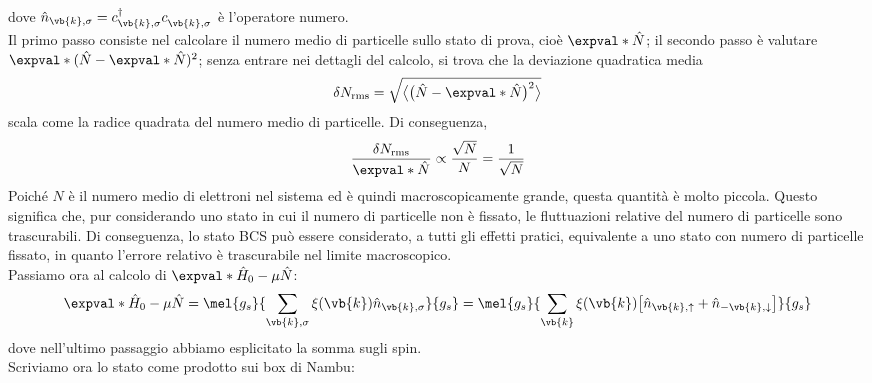dove $\hat{n}_{\vb{k},\sigma}=c^{\dag}_{\vb{k},\sigma} c^{\vphantom{\dag}}_{\vb{k},\sigma}$ è l'operatore numero.\\
Il primo passo consiste nel calcolare il numero medio di particelle sullo stato di prova, cioè $\expval*{\hat{N}}$; il secondo passo è valutare $\expval*{(\hat{N} - \expval*{\hat{N}})^2}$; senza entrare nei dettagli del calcolo, si trova che la deviazione quadratica media
\begin{equation*}
   \delta N_{\rm rms}
   =\sqrt{\big\langle \bigl( \hat{N} - \expval*{\hat{N}} \bigr)^2 \big\rangle}
\end{equation*}
scala come la radice quadrata del numero medio di particelle. Di conseguenza,
\begin{equation*}
   \frac{\delta N_{\rm rms}}{\expval*{\hat{N}}}
   \propto \frac{\sqrt{N}}{N}
   =\frac{1}{\sqrt{N}}
\end{equation*}
Poiché $N$ è il numero medio di elettroni nel sistema ed è quindi macroscopicamente grande, questa quantità è molto piccola. Questo significa che, pur considerando uno stato in cui il numero di particelle non è fissato, le fluttuazioni relative del numero di particelle sono trascurabili. Di conseguenza, lo stato BCS può essere considerato, a tutti gli effetti pratici, equivalente a uno stato con numero di particelle fissato, in quanto l'errore relativo è trascurabile nel limite macroscopico.
\\
Passiamo ora al calcolo di $\expval*{\hat{H}_0 - \mu \hat{N}}$:
\begin{equation*}
   \expval*{\hat{H}_0 - \mu \hat{N}}
   =\mel{g_s}{\sum_{\vb{k},\sigma} \xi(\vb{k}) \hat{n}_{\vb{k},\sigma}}{g_s}
   =\mel{g_s}{\sum_{\vb{k}} \xi(\vb{k}) \bigl[ \hat{n}_{\vb{k},\uparrow} + \hat{n}_{-\vb{k},\downarrow} \bigr]}{g_s}
\end{equation*}
dove nell'ultimo passaggio abbiamo esplicitato la somma sugli spin.\\
Scriviamo ora lo stato come prodotto sui box di Nambu:
